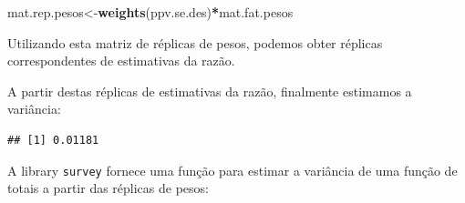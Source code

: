 \documentclass[]{book}
\newenvironment{Shaded}{\begin{snugshade}}{\end{snugshade}}
\newcommand{\KeywordTok}[1]{\textcolor[rgb]{0.13,0.29,0.53}{\textbf{#1}}}
\newcommand{\DecValTok}[1]{\textcolor[rgb]{0.00,0.00,0.81}{#1}}
\newcommand{\StringTok}[1]{\textcolor[rgb]{0.31,0.60,0.02}{#1}}
\newcommand{\ControlFlowTok}[1]{\textcolor[rgb]{0.13,0.29,0.53}{\textbf{#1}}}
\newcommand{\OperatorTok}[1]{\textcolor[rgb]{0.81,0.36,0.00}{\textbf{#1}}}
\newcommand{\NormalTok}[1]{#1}
\theoremstyle{definition}
\theoremstyle{definition}
\theoremstyle{definition}
\theoremstyle{remark}
\begin{document}
\begin{Shaded}
\begin{Highlighting}[]
\NormalTok{mat.rep.pesos<-}\KeywordTok{weights}\NormalTok{(ppv.se.des)}\OperatorTok{*}\NormalTok{mat.fat.pesos}
\end{Highlighting}
\end{Shaded}

Utilizando esta matriz de réplicas de pesos, podemos obter réplicas
correspondentes de estimativas da razão.

\begin{Shaded}
\end{Shaded}

A partir destas réplicas de estimativas da razão, finalmente estimamos a
variância:

\begin{Shaded}
\end{Shaded}

\begin{verbatim}
## [1] 0.01181
\end{verbatim}

A library \texttt{survey} \citep{R-survey} fornece uma função para
estimar a variância de uma função de totais a partir das réplicas de
pesos:
\end{document}
